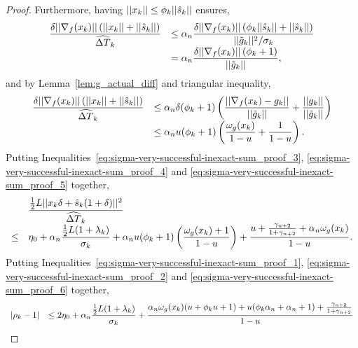 \documentclass{article}[12pt]
\begin{document}
\begin{proof}
    	Furthermore, having $||x_k|| \leq \phi_k ||\hat{s}_{k}||$ ensures,
    	\begin{equation}
    		\begin{array}{ll}
    			\dfrac{\delta||\nabla_f(x_k)||\left(||x_k||+||\hat{s}_{k}||\right)}{\widehat{\Delta T}_k} & \leq \alpha_n \dfrac{\delta||\nabla_f(x_k)||\left(\phi_k||\hat{s}_{k}||+||\hat{s}_{k}||\right)}{||\tilde{g}_k||^2/\sigma_k}\\
    			& = \alpha_n \dfrac{\delta||\nabla_f(x_k)||\left(\phi_k+1\right)}{||\tilde{g}_k||},\\
    		\end{array}
    	\end{equation}
    	and by Lemma~\ref{lem:g_actual_diff} and triangular inequality,
    	\begin{equation}
    		\label{eq:sigma-very-successful-inexact-sum_proof_5}
    		\begin{array}{ll}
    			\dfrac{\delta||\nabla_f(x_k)||\left(||x_k||+||\hat{s}_{k}||\right)}{\widehat{\Delta T}_k} & \leq \alpha_n \delta(\phi_k+1)\left( \dfrac{||\nabla_f(x_k)-g_k||}{||\tilde{g}_k||} +  \dfrac{||g_k||}{||\tilde{g}_k||}\right)\\
    			& \leq \alpha_n u(\phi_k+1)\left( \dfrac{\omega_g(x_k)}{1-u} +  \dfrac{1}{1-u}\right).\\
    		\end{array}
    	\end{equation}
    	Putting Inequalities~\eqref{eq:sigma-very-successful-inexact-sum_proof_3}, \eqref{eq:sigma-very-successful-inexact-sum_proof_4} and \eqref{eq:sigma-very-successful-inexact-sum_proof_5} together,
    	\begin{equation}
    		\label{eq:sigma-very-successful-inexact-sum_proof_6}
    		\begin{array}{ll}
    			& \dfrac{\tfrac{1}{2}L||x_k \delta+\hat{s}_{k}(1+\delta)||^2}{\widehat{\Delta T}_k}\\
    			\leq & \eta_0 + \alpha_n \dfrac{\tfrac{1}{2}L(1+\lambda_k)}{\sigma_k} + \alpha_n u(\phi_k+1)\left( \dfrac{\omega_g(x_k)+1}{1-u}\right) +  \dfrac{u+\frac{\gamma_{n+2}}{1+\gamma_{n+2}}+\alpha_n\omega_g(x_k)}{1-u}.
    		\end{array} 
    	\end{equation} 
    	Putting Inequalities~\eqref{eq:sigma-very-successful-inexact-sum_proof_1}, \eqref{eq:sigma-very-successful-inexact-sum_proof_2} and \eqref{eq:sigma-very-successful-inexact-sum_proof_6} together,
    	\begin{equation}
    		\begin{array}{ll}
    			|\rho_k - 1|  & \leq 2 \eta_0 + \alpha_n \dfrac{\tfrac{1}{2}L(1+\lambda_k)}{\sigma_k} + \dfrac{\alpha_n \omega_g(x_k)(u+\phi_k u+1) + u(\phi_k\alpha_n+\alpha_n+1) + \frac{\gamma_{n+2}}{1+\gamma_{n+2}}}{1-u} \\
    		\end{array}
    	\end{equation} 
    	

\end{proof}
\end{document}
